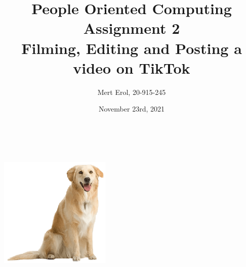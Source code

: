 \title{\large People Oriented Computing Assignment 2\\[0.5cm]
        \bf\Large Filming, Editing and Posting a video on TikTok}
\author{\large Mert Erol, 20-915-245}
\date{November 23rd, 2021}
\makeatletter
    \begin{titlepage}
        \begin{center}
        \vbox{}\vspace{5cm}
            {\@title }\\[3cm] 
            {\@author}\\
            \vfill \includegraphics[scale=0.3]{images/logo.png}\\[1cm]
            {\@date}
        \end{center}
    \end{titlepage}
\makeatother
